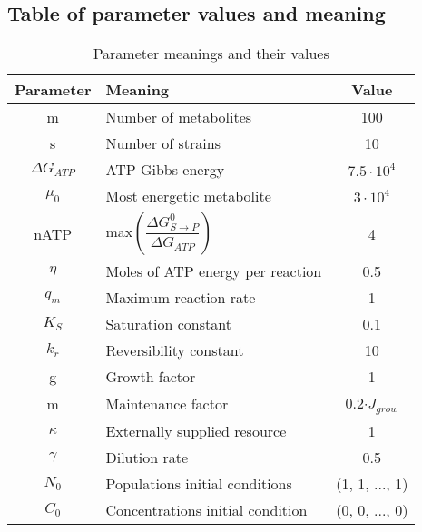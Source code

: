 \documentclass[titlepage,11pt]{article}
\begin{document}
\begin{linenumbers}
			\subsection{Table of parameter values and meaning}\label{subsec:parameters}
			\begin{table}[h]
			\centering
			\begin{tabular}{ |c|l|c| } 
				\hline
				Parameter & Meaning & Value \\
				\hline
				m &Number of metabolites &  100 \\ 
				s &Number of strains &  10 \\ 
				$ \Delta G_{ATP} $ &ATP Gibbs energy & $ 7.5\cdot 10^{4} $\\ 
				$ \mu_0 $ & Most energetic metabolite &  $ 3\cdot 10^{4} $ \\ 
				nATP &max$\left(\dfrac{\Delta G^{0}_{S\rightarrow P}}{\Delta G_{ATP}}\right)$ &  4 \\ 
				$ \eta $ &Moles of ATP energy per reaction &  0.5  \\ 
				$ q_m $ &Maximum reaction rate &  1 \\ 
				$ K_S $ &Saturation constant &   0.1 \\ 
				$ k_r $ &Reversibility constant &  10 \\ 
				g & Growth factor & 1 \\ 
				m  & Maintenance factor &   0.2$\cdot J_{grow}$ \\ 
				$ \kappa $  & Externally supplied resource &  1 \\ 
				$ \gamma $ &Dilution rate &   0.5 \\ 
				$ N_{0}$ & Populations initial conditions &   (1, 1, ..., 1)\\ 
				$ C_{0}$ & Concentrations initial condition &   (0, 0, ..., 0)\\
				\hline
			\end{tabular}
			\caption{Parameter meanings and their values}
			\label{tab:parameters}
		\end{table}


	\end{linenumbers}
		\newpage
		
		
	
\end{document}
